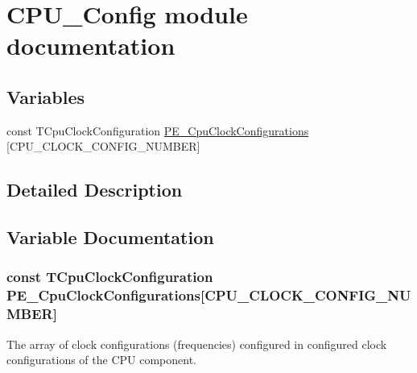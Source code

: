 \hypertarget{group___c_p_u___config__module}{}\section{C\+P\+U\+\_\+\+Config module documentation}
\label{group___c_p_u___config__module}
\subsection*{Variables}
\begin{DoxyCompactItemize}
\item 
const T\+Cpu\+Clock\+Configuration \hyperlink{group___c_p_u___config__module_gab69281f0e90d16198a5595ed7f471441}{P\+E\+\_\+\+Cpu\+Clock\+Configurations} \mbox{[}C\+P\+U\+\_\+\+C\+L\+O\+C\+K\+\_\+\+C\+O\+N\+F\+I\+G\+\_\+\+N\+U\+M\+B\+ER\mbox{]}
\end{DoxyCompactItemize}


\subsection{Detailed Description}


\subsection{Variable Documentation}
\subsubsection[{\texorpdfstring{P\+E\+\_\+\+Cpu\+Clock\+Configurations}{PE_CpuClockConfigurations}}]{\setlength{\rightskip}{0pt plus 5cm}const T\+Cpu\+Clock\+Configuration P\+E\+\_\+\+Cpu\+Clock\+Configurations\mbox{[}C\+P\+U\+\_\+\+C\+L\+O\+C\+K\+\_\+\+C\+O\+N\+F\+I\+G\+\_\+\+N\+U\+M\+B\+ER\mbox{]}}\hypertarget{group___c_p_u___config__module_gab69281f0e90d16198a5595ed7f471441}{}\label{group___c_p_u___config__module_gab69281f0e90d16198a5595ed7f471441}
The array of clock configurations (frequencies) configured in configured clock configurations of the C\+PU component. 